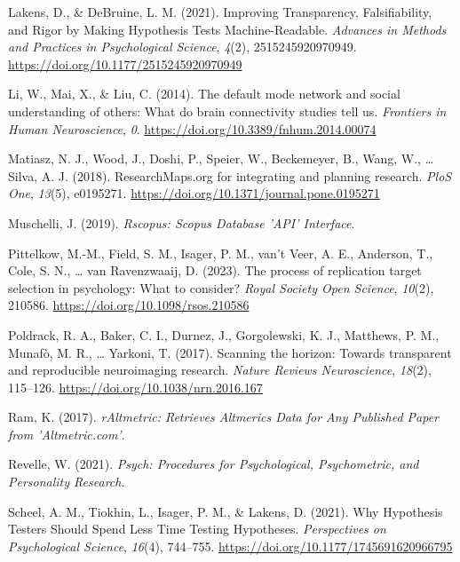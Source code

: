 \documentclass[
  man,floatsintext]{apa6}
\newlength{\cslhangindent}
\newlength{\cslentryspacingunit} %
\newenvironment{CSLReferences}[2] %
 {%
  \setlength{\parindent}{0pt}
  \ifodd #1
  \let\oldpar\par
  \def\par{\hangindent=\cslhangindent\oldpar}
  \fi
  \setlength{\parskip}{#2\cslentryspacingunit}
 }%
 {}
\begin{document}
\begin{CSLReferences}{1}{0}
\leavevmode{}%
Lakens, D., \& DeBruine, L. M. (2021). Improving {Transparency}, {Falsifiability}, and {Rigor} by {Making Hypothesis Tests Machine-Readable}. \emph{Advances in Methods and Practices in Psychological Science}, \emph{4}(2), 2515245920970949. \url{https://doi.org/10.1177/2515245920970949}

\leavevmode{}%
Li, W., Mai, X., \& Liu, C. (2014). The default mode network and social understanding of others: What do brain connectivity studies tell us. \emph{Frontiers in Human Neuroscience}, \emph{0}. \url{https://doi.org/10.3389/fnhum.2014.00074}

\leavevmode{}%
Matiasz, N. J., Wood, J., Doshi, P., Speier, W., Beckemeyer, B., Wang, W., \ldots{} Silva, A. J. (2018). {ResearchMaps}.org for integrating and planning research. \emph{PloS One}, \emph{13}(5), e0195271. \url{https://doi.org/10.1371/journal.pone.0195271}

\leavevmode{}%
Muschelli, J. (2019). \emph{Rscopus: {Scopus Database} '{API}' {Interface}}.

\leavevmode{}%
Pittelkow, M.-M., Field, S. M., Isager, P. M., van't Veer, A. E., Anderson, T., Cole, S. N., \ldots{} van Ravenzwaaij, D. (2023). The process of replication target selection in psychology: What to consider? \emph{Royal Society Open Science}, \emph{10}(2), 210586. \url{https://doi.org/10.1098/rsos.210586}

\leavevmode{}%
Poldrack, R. A., Baker, C. I., Durnez, J., Gorgolewski, K. J., Matthews, P. M., Munafò, M. R., \ldots{} Yarkoni, T. (2017). Scanning the horizon: Towards transparent and reproducible neuroimaging research. \emph{Nature Reviews Neuroscience}, \emph{18}(2), 115--126. \url{https://doi.org/10.1038/nrn.2016.167}

\leavevmode{}%
Ram, K. (2017). \emph{{rAltmetric}: {Retrieves Altmerics Data} for {Any Published Paper} from '{Altmetric}.com'}.

\leavevmode{}%
Revelle, W. (2021). \emph{Psych: {Procedures} for {Psychological}, {Psychometric}, and {Personality Research}}.

\leavevmode{}%
Scheel, A. M., Tiokhin, L., Isager, P. M., \& Lakens, D. (2021). Why {Hypothesis Testers Should Spend Less Time Testing Hypotheses}. \emph{Perspectives on Psychological Science}, \emph{16}(4), 744--755. \url{https://doi.org/10.1177/1745691620966795}


\end{CSLReferences}
\end{document}
